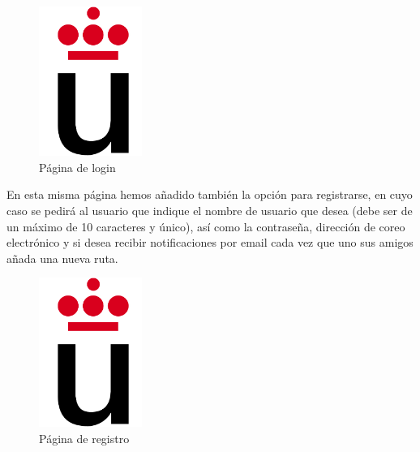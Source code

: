 \documentclass[11pt,a4paper]{article}
\begin{document}
\begin{figure}[h]
\centering
  \includegraphics[width=0.3\textwidth]{./imagenes/logoURJC}
  \caption{Página de login}
  \label{fig: Página de login}
\end{figure}
En esta misma página hemos añadido también la opción para registrarse, en cuyo caso se pedirá al usuario que indique el nombre de usuario que desea (debe ser de un máximo de 10 caracteres y único), así como la contraseña, dirección de coreo electrónico y si desea recibir notificaciones por email cada vez que uno sus amigos añada una nueva ruta.\\


\begin{figure}[h]
\centering
  \includegraphics[width=0.3\textwidth]{./imagenes/logoURJC}
  \caption{Página de registro}
  \label{fig: Página de registro}
\end{figure}
\end{document}
